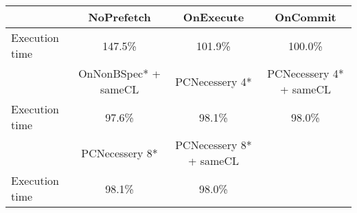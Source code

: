 \begin{tabular}{ l|ccc }
 & NoPrefetch & OnExecute & OnCommit\\ \hline
Execution time & 147.5\% & 101.9\% & 100.0\%\\ \hline
\hline
 & OnNonBSpec* + sameCL & PCNecessery 4* & PCNecessery 4* + sameCL\\ \hline
Execution time & 97.6\% & 98.1\% & 98.0\%\\ \hline
\hline
 & PCNecessery 8* & PCNecessery 8* + sameCL&\\ \hline
Execution time & 98.1\% & 98.0\%&\\ \hline
\end{tabular}

